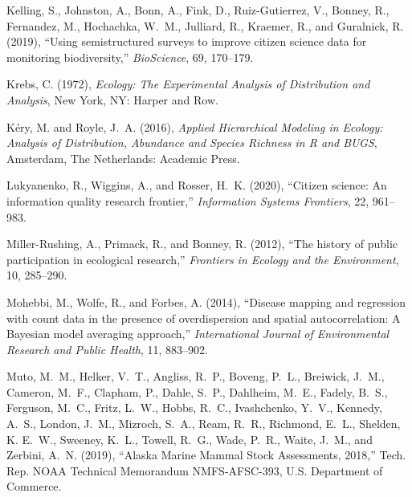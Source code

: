 \documentclass[11pt, titlepage]{article}
\begin{document}
\begin{spacing}{1.9}
\begin{flushleft}
\begin{thebibliography}{59}
Kelling, S., Johnston, A., Bonn, A., Fink, D., Ruiz-Gutierrez, V., Bonney, R.,
  Fernandez, M., Hochachka, W.~M., Julliard, R., Kraemer, R., and Guralnick, R.
  (2019), \enquote{Using semistructured surveys to improve citizen science data
  for monitoring biodiversity,} \textit{BioScience}, 69, 170--179.

Krebs, C. (1972), \textit{Ecology: {The} {Experimental} {Analysis} of
  {Distribution} and {Analysis}}, New York, NY: Harper and Row.

Kéry, M. and Royle, J.~A. (2016), \textit{Applied {Hierarchical} {Modeling} in
  {Ecology}: {Analysis} of {Distribution}, {Abundance} and {Species} {Richness}
  in {R} and {BUGS}}, Amsterdam, The Netherlands: Academic Press.

Lukyanenko, R., Wiggins, A., and Rosser, H.~K. (2020), \enquote{Citizen
  science: {An} information quality research frontier,} \textit{Information
  Systems Frontiers}, 22, 961--983.

Miller-Rushing, A., Primack, R., and Bonney, R. (2012), \enquote{The history of
  public participation in ecological research,} \textit{Frontiers in Ecology
  and the Environment}, 10, 285--290.

Mohebbi, M., Wolfe, R., and Forbes, A. (2014), \enquote{Disease mapping and
  regression with count data in the presence of overdispersion and spatial
  autocorrelation: {A} {Bayesian} model averaging approach,}
  \textit{International Journal of Environmental Research and Public Health},
  11, 883--902.

Muto, M.~M., Helker, V.~T., Angliss, R.~P., Boveng, P.~L., Breiwick, J.~M.,
  Cameron, M.~F., Clapham, P., Dahle, S.~P., Dahlheim, M.~E., Fadely, B.~S.,
  Ferguson, M.~C., Fritz, L.~W., Hobbs, R.~C., Ivashchenko, Y.~V., Kennedy,
  A.~S., London, J.~M., Mizroch, S.~A., Ream, R.~R., Richmond, E.~L., Shelden,
  K. E.~W., Sweeney, K.~L., Towell, R.~G., Wade, P.~R., Waite, J.~M., and
  Zerbini, A.~N. (2019), \enquote{Alaska {Marine} {Mammal} {Stock}
  {Assessments}, 2018,} Tech. Rep. NOAA Technical Memorandum NMFS-AFSC-393,
  U.S. Department of Commerce.


\end{thebibliography}
\end{flushleft}
\end{spacing}
\end{document}
